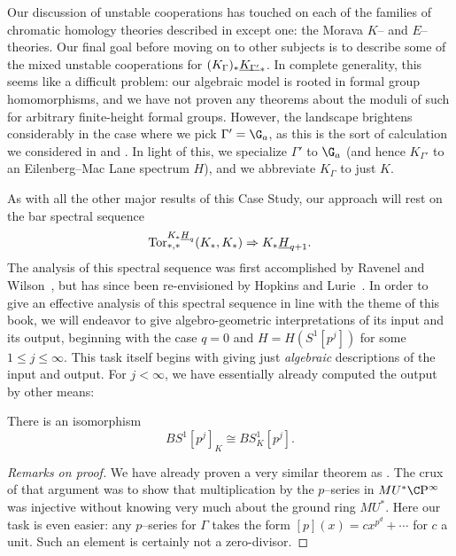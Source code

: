 Our discussion of unstable cooperations has touched on each of the families of chromatic homology theories described in  except one: the Morava $K$-- and $E$--theories.  Our final goal before moving on to other subjects is to describe some of the mixed unstable cooperations for $(K_\Gamma)_* \underline{\smash{K_{\Gamma'}}}_{*}$.  In complete generality, this seems like a difficult problem: our algebraic model is rooted in formal group homomorphisms, and we have not proven any theorems about the moduli of such for arbitrary finite-height formal groups.  However, the landscape brightens considerably in the case where we pick $\Gamma' = \G_a$, as this is the sort of calculation we considered in  and .  In light of this, we specialize $\Gamma'$ to $\G_a$ (and hence $K_{\Gamma'}$ to an Eilenberg--Mac Lane spectrum $H$), and we abbreviate $K_\Gamma$ to just $K$.

As with all the other major results of this Case Study, our approach will rest on the bar spectral sequence \[\operatorname{Tor}^{K_* \underline{\smash{H}}_{q}}_{*, *}(K_*, K_*) \Rightarrow K_* \underline{\smash{H}}_{q+1}.\]  The analysis of this spectral sequence was first accomplished by Ravenel and Wilson~\cite{RavenelWilsonKthyOfEMSpaces}, but has since been re-envisioned by Hopkins and Lurie~\cite[Section 2]{HopkinsLurie}.  In order to give an effective analysis of this spectral sequence in line with the theme of this book, we will endeavor to give algebro-geometric interpretations of its input and its output, beginning with the case $q = 0$ and $H = H(S^1[p^j])$ for some $1 \le j \le \infty$.  This task itself begins with giving just \emph{algebraic} descriptions of the input and output.  For $j < \infty$, we have essentially already computed the output by other means:

\begin{theorem}\label{KtheoryConvertsTorsionToTorsion}
There is an isomorphism \[BS^1[p^j]_K \cong BS^1_K[p^j].\]
\end{theorem}
\begin{proof}[Remarks on proof]
We have already proven a very similar theorem as .  The crux of that argument was to show that multiplication by the $p$--series in $MU^* \CP^\infty$ was injective without knowing very much about the ground ring $MU^*$.  Here our task is even easier: any $p$--series for $\Gamma$ takes the form $[p](x) = c x^{p^d} + \cdots$ for $c$ a unit.  Such an element is certainly not a zero-divisor.
\end{proof}

